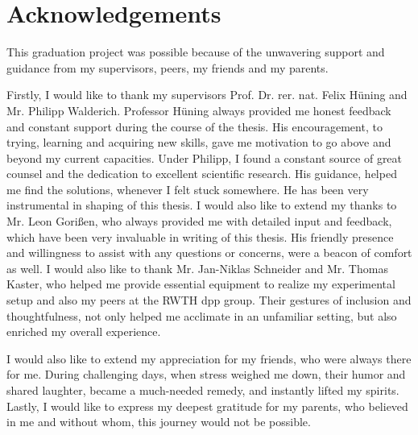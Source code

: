 \chapter*{Acknowledgements}
This graduation project was possible because of the unwavering support and guidance from my supervisors, peers, my friends and my parents.

\vspace{5mm}

\noindent Firstly, I would like to thank my supervisors Prof. Dr. rer. nat. Felix Hüning and Mr. Philipp Walderich. Professor Hüning always provided me honest feedback and constant support during the course of the thesis. His encouragement, to trying, learning and acquiring new skills, gave me motivation to go above and beyond my current capacities. Under Philipp, I found a constant source of great counsel and the dedication to excellent scientific research. His guidance, helped me find the solutions, whenever I felt stuck somewhere. He has been very instrumental in shaping of this thesis. I would also like to extend my thanks to Mr. Leon Gorißen, who always provided me with detailed input and feedback, which have been very invaluable in writing of this thesis. His friendly presence and willingness to assist with any questions or concerns, were a beacon of comfort as well. I would also like to thank Mr. Jan-Niklas Schneider and Mr. Thomas Kaster, who helped me provide essential equipment to realize my experimental setup and also my peers at the RWTH \gls{dpp} group. Their gestures of inclusion and thoughtfulness, not only helped me acclimate in an unfamiliar setting, but also enriched my overall experience.

\vspace{5mm}

\noindent I would also like to extend my appreciation for my friends, who were always there for me. During challenging days, when stress weighed me down, their humor and shared laughter, became a much-needed remedy, and instantly lifted my spirits. Lastly, I would like to express my deepest gratitude for my parents, who believed in me and without whom, this journey would not be possible.